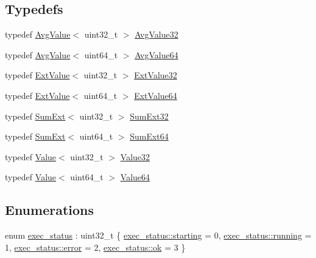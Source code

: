 \subsection*{Typedefs}
\begin{DoxyCompactItemize}
\item 
typedef \hyperlink{classxtd_1_1counters_1_1AvgValue}{Avg\-Value}$<$ uint32\-\_\-t $>$ \hyperlink{namespacextd_1_1counters_a162dd5cde0e6fcc970c543f7420b4c14}{Avg\-Value32}
\item 
typedef \hyperlink{classxtd_1_1counters_1_1AvgValue}{Avg\-Value}$<$ uint64\-\_\-t $>$ \hyperlink{namespacextd_1_1counters_aa43118623f65cdf1ba43bffd8f17ea0e}{Avg\-Value64}
\item 
typedef \hyperlink{classxtd_1_1counters_1_1ExtValue}{Ext\-Value}$<$ uint32\-\_\-t $>$ \hyperlink{namespacextd_1_1counters_ae049cff0f00adb1728a511d333c2aa50}{Ext\-Value32}
\item 
typedef \hyperlink{classxtd_1_1counters_1_1ExtValue}{Ext\-Value}$<$ uint64\-\_\-t $>$ \hyperlink{namespacextd_1_1counters_ad0d26d26ad71069f92a20b6d870e4872}{Ext\-Value64}
\item 
typedef \hyperlink{classxtd_1_1counters_1_1SumExt}{Sum\-Ext}$<$ uint32\-\_\-t $>$ \hyperlink{namespacextd_1_1counters_a7e0abdd1fae0f70421c2e0ea3924db6f}{Sum\-Ext32}
\item 
typedef \hyperlink{classxtd_1_1counters_1_1SumExt}{Sum\-Ext}$<$ uint64\-\_\-t $>$ \hyperlink{namespacextd_1_1counters_a268d063d4f32d16f65c388b8791602e3}{Sum\-Ext64}
\item 
typedef \hyperlink{classxtd_1_1counters_1_1Value}{Value}$<$ uint32\-\_\-t $>$ \hyperlink{namespacextd_1_1counters_ad10dfbcb762ad7dfc7199ab5a268bc6e}{Value32}
\item 
typedef \hyperlink{classxtd_1_1counters_1_1Value}{Value}$<$ uint64\-\_\-t $>$ \hyperlink{namespacextd_1_1counters_a20cdfbbbf5aa96abb1c5d461497d1769}{Value64}
\end{DoxyCompactItemize}
\subsection*{Enumerations}
\begin{DoxyCompactItemize}
\item 
enum \hyperlink{namespacextd_1_1counters_a408a8b2fd75b44228e1741ac4a32aff8}{exec\-\_\-status} \-: uint32\-\_\-t \{ \hyperlink{namespacextd_1_1counters_a408a8b2fd75b44228e1741ac4a32aff8a1ee85f6c60017a7f0646ba8dc5824de6}{exec\-\_\-status\-::starting} = 0, 
\hyperlink{namespacextd_1_1counters_a408a8b2fd75b44228e1741ac4a32aff8a75101dcdfc88455bcafc9e53e0b06689}{exec\-\_\-status\-::running} = 1, 
\hyperlink{namespacextd_1_1counters_a408a8b2fd75b44228e1741ac4a32aff8acb5e100e5a9a3e7f6d1fd97512215282}{exec\-\_\-status\-::error} = 2, 
\hyperlink{namespacextd_1_1counters_a408a8b2fd75b44228e1741ac4a32aff8a444bcb3a3fcf8389296c49467f27e1d6}{exec\-\_\-status\-::ok} = 3
 \}
\end{DoxyCompactItemize}


